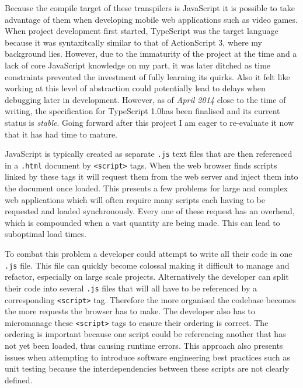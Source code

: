 \documentclass[final]{cmpreport}
\begin{document}
Because the compile target of these transpilers is JavaScript it is possible to take advantage of them when developing mobile web applications such as video games. When project development first started, TypeScript was the target language because it was syntaxitcally similar to that of ActionScript 3, where my background lies. However, due to the immaturity of the project at the time and a lack of core JavaScript knowledge on my part, it was later ditched as time constraints prevented the investment of fully learning its quirks. Also it felt like working at this level of abstraction could potentially lead to delays when debugging later in development. However, as of \textit{April 2014} close to the time of writing, the specification for TypeScript 1.0\footnotemark has been finalised and its current status is \textit{stable}. Going forward after this project I am eager to re-evaluate it now that it has had time to mature.


JavaScript is typically created as separate \texttt{.js} text files that are then referenced in a \texttt{.html} document by \texttt{<script>} tags. When the web browser finds scripts linked by these tags it will request them from the web server and inject them into the document once loaded. This presents a few problems for large and complex web applications which will often require many scripts each having to be requested and loaded synchronously. Every one of these request has an overhead, which is compounded when a vast quantity are being made. This can lead to suboptimal load times.

To combat this problem a developer could attempt to write all their code in one \texttt{.js} file. This file can quickly become colossal making it difficult to manage and refactor, especially on large scale projects. Alternatively the developer can split their code into several \texttt{.js} files that will all have to be referenced by a corresponding \texttt{<script>} tag. Therefore the more organised the codebase becomes the more requests the browser has to make. The developer also has to micromanage these \texttt{<script>} tags to ensure their ordering is correct. The ordering is important because one script could be referencing another that has not yet been loaded, thus causing runtime errors. This approach also presents issues when attempting to introduce software engineering best practices such as unit testing because the interdependencies between these scripts are not clearly defined.
\end{document}

